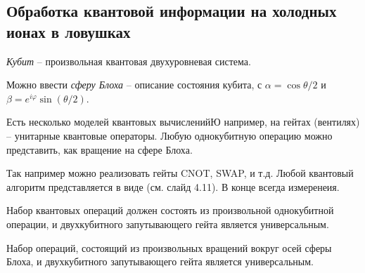 \subsection{Обработка квантовой информации на холодных ионах в ловушках}

\begin{to_def}
    \textit{Кубит} -- произвольная квантовая двухуровневая система.
\end{to_def}

Можно ввести \textit{сферу Блоха} -- описание состояния кубита, с $\alpha = \cos \theta/2$ и $\beta = e^{i\varphi} \sin (\theta/2)$.


Есть несколько моделей квантовых вычисленийЮ например, на гейтах (вентилях) -- унитарные квантовые операторы. Любую однокубитную операцию можно представить, как вращение на сфере Блоха. 

Так например можно реализовать гейты CNOT, SWAP, и т.д. Любой квантовый алгоритм представляется в виде (см. слайд 4.11). В конце всегда измеренеия. 

\begin{to_thr}[]
    Набор квантовых операций должен состоять из произвольной однокубитной операции, и двухкубитного запутывающего гейта является универсальным.
\end{to_thr}

\begin{to_con}
    Набор операций, состоящий из произвольных вращений вокруг осей сферы Блоха, и двухкубитного запутывающего гейта является универсальным.
\end{to_con}


% 







% 





% 







